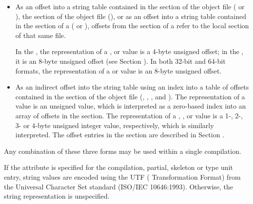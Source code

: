 \begin{itemize}
\begin{itemize}
\item As an 
offset into a string table contained in
the \dotdebugstr{} section of the object file (\DWFORMstrpTARG{}
\bb
or \DWFORMstrpeightTARG),
\eb
the \dotdebuglinestr{} section of the object file (\DWFORMlinestrpTARG),
or as an offset into a string table contained in the
\dotdebugstr{} section of a  
(\DWFORMstrpsupTARG{}
\bb
or \DWFORMstrpsupeightTARG),
\eb
\DWFORMstrpsupNAME{} offsets from the \dotdebuginfo{}  
section of a 
refer to the local \dotdebugstr{} section of that same file.

In the \thirtytwobitdwarfformat, the representation of a 
\DWFORMstrpNAME{}, \DWFORMlinestrpNAME{} or \DWFORMstrpsupNAME{}
value is a 4-byte unsigned offset; in the \sixtyfourbitdwarfformat,
it is an 8-byte unsigned offset 
(see Section ).
\bb
In both 32-bit and 64-bit formats, the representation of a 
\DWFORMstrpeight{} or \DWFORMstrpsupeight{} 
value is an 8-byte unsigned offset.
\eb

\item As an indirect offset into the string table using an 
index into a table of offsets contained in the 
\dotdebugstroffsets{} section of the object file 
(\DWFORMstrxTARG, \DWFORMstrxoneTARG, \DWFORMstrxtwoTARG, 
\DWFORMstrxthreeTARG{} and \DWFORMstrxfourTARG).
The representation of a \DWFORMstrxNAME{} value is an unsigned 
 value, which is interpreted as a zero-based 
index into an array of offsets in the \dotdebugstroffsets{} section.
The representation of a \DWFORMstrxoneNAME, \DWFORMstrxtwoNAME, 
\DWFORMstrxthreeNAME{} or \DWFORMstrxfourNAME{} value is a 
1-, 2-, 3- or 4-byte unsigned integer value, respectively,
which is similarly interpreted.
The offset entries in the \dotdebugstroffsets{} section 
\bb
are described in Section .
\eb
\end{itemize}
Any combination of these three forms may be used within a single compilation.

If the \DWATuseUTFeight{}
 attribute is specified for the
compilation, partial, skeleton or type unit entry, string values are encoded using the
UTF ( Transformation Format) from the Universal
Character Set standard (ISO/IEC 10646:1993).
Otherwise, the string representation is unspecified.


\end{itemize}
